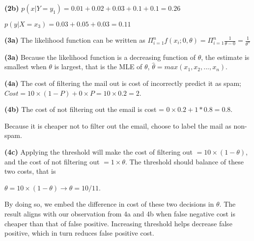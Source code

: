 \documentclass[12pt,article]{article}
\begin{document}
\textbf{(2b)} \newline
$p(x|Y = y_1) = 0.01 + 0.02 + 0.03 + 0.1 + 0.1 = 0.26$

$p(y|X = x_3) = 0.03 + 0.05 + 0.03 = 0.11$

\textbf{(3a)} \newline
The likelihood function can be written as
$\Pi_{i=1}^nf(x_i;0,\theta) = \Pi_{i=1}^n\frac{1}{\theta - 0} = \frac{1}{\theta^n}$

\textbf{(3a)} \newline
Because the likelihood function is a decreasing function of $\theta$, the 
estimate is smallest when $\theta$ is largest, that is the MLE of $\theta$, $\hat{\theta} = max(x_1, x_2,...,x_n)$.

\textbf{(4a)} \newline
The cost of filtering the mail out is cost of incorrectly predict it as spam; 
$Cost = 10 \times (1 - P) + 0 \times P = 10 \times 0.2 = 2$.

\textbf{(4b)} \newline
The cost of not filtering out the email is cost = $0 \times 0.2 + 1 * 0.8 = 0.8$.

Because it is cheaper not to filter out the email, choose to label the mail as 
non-spam.

\textbf{(4c)} \newline
Applying the threshold will make the cost of filtering out $= 10 \times (1 - \theta)$, 
and the cost of not filtering out $= 1 \times \theta$. The threshold should 
balance of these two costs, that is 

$\theta = 10 \times (1 - \theta) \rightarrow \theta = 10/11$. 

By doing so, we embed the difference in cost of these two decisions in $\theta$. 
The result aligns with our observation from 4a and 4b when false negative cost is 
cheaper than that of false positive. Increasing threshold helps decrease false positive, 
which in turn reduces false positive cost.
\end{document}
